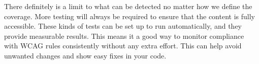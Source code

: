 \documentclass{master_thesis}
\begin{document}
There definitely is a limit to what can be detected no matter how we define the coverage. More testing will always be required to ensure that the content is fully accessible. These kinds of tests can be set up to run automatically, and they provide measurable results. This means it a good way to monitor compliance with WCAG rules consistently without any extra effort. This can help avoid unwanted changes and show easy fixes in  your code.

\end{document}
